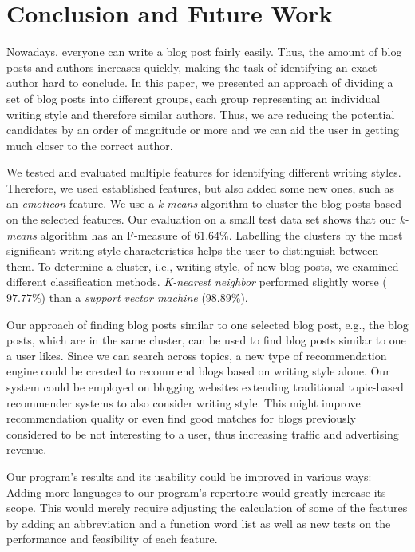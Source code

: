 \section{Conclusion and Future Work}
\label{sec:conclusion}


Nowadays, everyone can write a blog post fairly easily.
Thus, the amount of blog posts and authors increases quickly, making the task of identifying an exact author hard to conclude.
In this paper, we presented an approach of dividing a set of blog posts into different groups, each group representing an individual writing style and therefore similar authors.
Thus, we are reducing the potential candidates by an order of magnitude or more and we can aid the user in getting much closer to the correct author.


We tested and evaluated multiple features for identifying different writing styles.
Therefore, we used established features, but also added some new ones, such as an \textit{emoticon} feature.
We use a \textit{k-means} algorithm to cluster the blog posts based on the selected features.
Our evaluation on a small test data set shows that our \textit{k-means} algorithm has an F-measure of $61.64\%$.
Labelling the clusters by the most significant writing style characteristics helps the user to distinguish between them.
To determine a cluster, i.e., writing style, of new blog posts, we examined different classification methods.
\textit{K-nearest neighbor} performed slightly worse ($97.77\%$) than a \textit{support vector machine} ($98.89\%$).


Our approach of finding blog posts similar to one selected blog post, e.g., the blog posts, which are in the same cluster, can be used to find blog posts similar to one a user likes.
Since we can search across topics, a new type of recommendation engine could be created to recommend blogs based on writing style alone.
Our system could be employed on blogging websites extending traditional topic-based recommender systems to also consider writing style.
This might improve recommendation quality or even find good matches for blogs previously considered to be not interesting to a user, thus increasing traffic and advertising revenue.


Our program's results and its usability could be improved in various ways: Adding more languages to our program’s repertoire would greatly increase its scope.
This would merely require adjusting the calculation of some of the features by adding an abbreviation and a function word list as well as new tests on the performance and feasibility of each feature.


